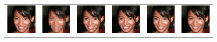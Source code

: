 \begin{figure}
\begin{center}
\begin{tabular}{cccccc}
      \includegraphics[width=.15\textwidth]{Chapter2/samples/super-resolution/table/2/x.png} &   
      \includegraphics[width=.15\textwidth]{Chapter2/samples/super-resolution/table/2/y.png} &
      \includegraphics[width=.15\textwidth]{Chapter2/samples/super-resolution/table/2/hcflow.png} &
      \includegraphics[width=.15\textwidth]{Chapter2/samples/super-resolution/table/2/sr3.png} & 
      \includegraphics[width=.15\textwidth]{Chapter2/samples/super-resolution/table/2/Song.png} &
      \includegraphics[width=.15\textwidth]{Chapter2/samples/super-resolution/table/2/DV.png} \\


\end{tabular}
\end{center}
\end{figure}
